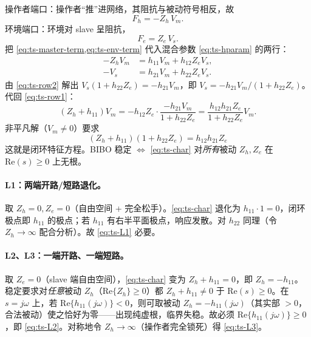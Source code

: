 \begin{derivation}[闭环特征方程]
操作者端口：操作者“推”进网络，其阻抗与被动符号相反，故
\begin{equation}
  F_h=-Z_h\,V_m.
  \label{eq:ts-master-term}
\end{equation}
环境端口：环境对 slave 呈阻抗，
\begin{equation}
  F_e=Z_e\,V_s.
  \label{eq:ts-env-term}
\end{equation}
把 \cref{eq:ts-master-term,eq:ts-env-term} 代入混合参数 \cref{eq:ts-hparam} 的两行：
\begin{align}
  -Z_h V_m &= h_{11}V_m+h_{12}Z_e V_s,\label{eq:ts-row1}\\
  -V_s &= h_{21}V_m+h_{22}Z_e V_s.\label{eq:ts-row2}
\end{align}
由 \cref{eq:ts-row2} 解出 $V_s(1+h_{22}Z_e)=-h_{21}V_m$，即 $V_s=-h_{21}V_m/(1+h_{22}Z_e)$。代回 \cref{eq:ts-row1}：
\begin{equation}
  (Z_h+h_{11})V_m=-h_{12}Z_e\cdot\frac{-h_{21}V_m}{1+h_{22}Z_e}
  =\frac{h_{12}h_{21}Z_e}{1+h_{22}Z_e}V_m.
\end{equation}
非平凡解（$V_m\neq0$）要求
\begin{equation}
  \boxed{\;(Z_h+h_{11})(1+h_{22}Z_e)=h_{12}h_{21}Z_e\;}
  \label{eq:ts-char}
\end{equation}
这就是闭环特征方程。BIBO 稳定 $\iff$ \cref{eq:ts-char} 对\emph{所有}被动 $Z_h,Z_e$ 在 $\mathrm{Re}(s)\ge0$ 上无根。
\end{derivation}

\paragraph{L1：两端开路/短路退化。}
取 $Z_h=0,Z_e=0$（自由空间 + 完全松手）。\cref{eq:ts-char} 退化为 $h_{11}\cdot1=0$，闭环极点即 $h_{11}$ 的极点；若 $h_{11}$ 有右半平面极点，响应发散。对 $h_{22}$ 同理（令 $Z_h\to\infty$ 配合分析）。故 \cref{eq:ts-L1} 必要。

\paragraph{L2、L3：一端开路、一端短路。}
取 $Z_e=0$（slave 端自由空间），\cref{eq:ts-char} 变为 $Z_h+h_{11}=0$，即 $Z_h=-h_{11}$。稳定要求对\emph{任意}被动 $Z_h$（$\mathrm{Re}\{Z_h\}\ge0$）都 $Z_h+h_{11}\neq0$ 于 $\mathrm{Re}(s)\ge0$。在 $s=j\omega$ 上，若 $\mathrm{Re}\{h_{11}(j\omega)\}<0$，则可取被动 $Z_h=-h_{11}(j\omega)$（其实部 $>0$，合法被动）使之恰好为零——出现纯虚根，临界失稳。故必须 $\mathrm{Re}\{h_{11}(j\omega)\}\ge0$，即 \cref{eq:ts-L2}。对称地令 $Z_h\to\infty$（操作者完全锁死）得 \cref{eq:ts-L3}。

